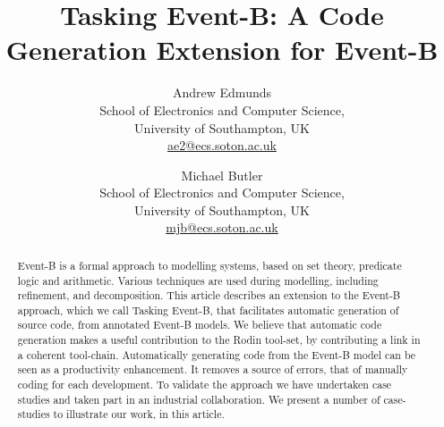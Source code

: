 \documentclass{article}
\begin{document}
\title{Tasking Event-B: A Code Generation Extension for Event-B}


\author{Andrew Edmunds\\
School of Electronics and Computer Science,\\
University of Southampton, UK\\
\url{ae2@ecs.soton.ac.uk}\\
\and
Michael Butler\\
School of Electronics and Computer Science,\\
University of Southampton, UK\\
\url{mjb@ecs.soton.ac.uk}\\
}

\maketitle
%
\begin{abstract}
Event-B is a formal approach to modelling systems, based on set theory, predicate logic and arithmetic. Various techniques are used during modelling, including refinement, and decomposition. This article describes an extension to the Event-B approach, which we call Tasking Event-B, that facilitates automatic generation of source code, from annotated Event-B models. We believe that automatic code generation makes a useful contribution to the Rodin tool-set, by contributing a link in a coherent tool-chain. Automatically generating code from the Event-B model can be seen as a productivity enhancement. It removes a source of errors, that of manually coding for each development. To validate the approach we have undertaken case studies and taken part in an industrial collaboration. We present a number of case-studies to illustrate our work, in this article.
\end{abstract}











%
\label{sect:bib}


\end{document}

